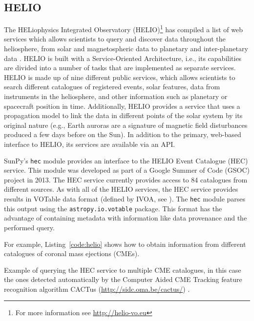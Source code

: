 \subsection{HELIO}\label{ssec:helio}

The HELiophysics Integrated Observatory (HELIO)\footnote{For more information 
see \url{http://helio-vo.eu}} has 
compiled a list of web services which allows scientists to query and 
discover data throughout the heliosphere, from solar and magnetospheric data to planetary and 
inter-planetary data \citep{perez-suarez2012}.
HELIO is built with a Service-Oriented Architecture, 
i.e., its capabilities are divided into a number of tasks that are 
implemented as separate services. 
HELIO is made up of nine different public services, 
which allows scientists to search different catalogues of registered events, 
solar features, data from instruments in the heliosphere, and other information 
such as planetary or spacecraft position in time. 
Additionally, HELIO provides a service that uses a 
propagation model to link the data in different points of the solar system by 
its original nature (e.g., Earth auroras are a signature of magnetic 
field disturbances produced a few days before on the Sun).
In addition to the primary, web-based interface to 
HELIO, its services are available via an API.

SunPy's \texttt{hec} module provides an interface to the
HELIO Event Catalogue (HEC) service. 
This module was developed as
part of a Google Summer of Code (GSOC) project in 2013.
The HEC service currently provides access to 84 catalogues from different
sources.
As with all of the HELIO services, the HEC service provides results in VOTable 
data format (defined by IVOA, see \citealt{ochsenbein2011}).
The \texttt{hec} module parses this output using the \texttt{astropy.io.votable} package.
This format has the advantage of containing metadata with information like
data provenance and the performed query.

For example, Listing~\ref{code:helio} shows how to obtain information
from different catalogues of coronal mass ejections (CMEs).

\begin{listing}[h]
\caption{Example of querying the HEC service to multiple CME
catalogues, in this case the ones detected automatically 
by the Computer Aided CME Tracking feature recognition algorithm CACTus (\url{http://sidc.oma.be/cactus/}) \citep{robbrecht_automated_2009}.}
\label{code:helio}
\end{listing}